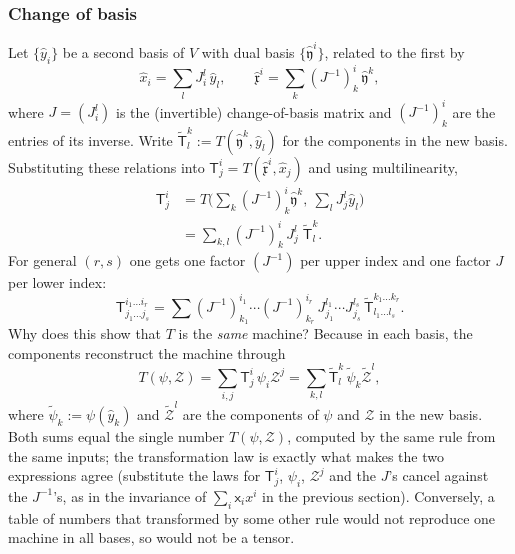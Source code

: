 \documentclass[11pt]{article}
\begin{document}
\subsubsection*{Change of basis}
Let $\{\hat y_i\}$ be a second basis of $V$ with dual basis $\{\hat{\mathfrak y}^i\}$, related to the first by
\[
\hat x_i=\sum_l J^l_i\,\hat y_l,\qquad \hat{\mathfrak x}^i=\sum_k(J^{-1})^i_k\,\hat{\mathfrak y}^k,
\]
where $J=(J^l_i)$ is the (invertible) change-of-basis matrix and $(J^{-1})^i_k$ are the entries of its inverse. Write $\tilde{\mathsf T}^k_l:=T(\hat{\mathfrak y}^k,\hat y_l)$ for the components in the new basis. Substituting these relations into $\mathsf T^i_j=T(\hat{\mathfrak x}^i,\hat x_j)$ and using multilinearity,
\begin{align*}
\mathsf T^i_j&=T\Big(\sum_k(J^{-1})^i_k\hat{\mathfrak y}^k,\ \sum_lJ^l_j\hat y_l\Big)\\
&=\sum_{k,l}(J^{-1})^i_k\,J^l_j\;\tilde{\mathsf T}^k_l.
\end{align*}
For general $(r,s)$ one gets one factor $(J^{-1})$ per upper index and one factor $J$ per lower index:
\[
\mathsf T^{i_1\dots i_r}_{j_1\dots j_s} = \sum (J^{-1})^{i_1}_{k_1}\cdots (J^{-1})^{i_r}_{k_r}\, J^{l_1}_{j_1}\cdots J^{l_s}_{j_s}\, \tilde{\mathsf T}^{k_1\dots k_r}_{l_1\dots l_s}.
\]
Why does this show that $T$ is the \emph{same} machine? Because in each basis, the components reconstruct the machine through
\[
T(\psi,\mathcal Z)=\sum_{i,j}\mathsf T^i_j\,\psi_i\mathcal Z^j=\sum_{k,l}\tilde{\mathsf T}^k_l\,\tilde\psi_k\tilde{\mathcal Z}^l,
\]
where $\tilde\psi_k:=\psi(\hat y_k)$ and $\tilde{\mathcal Z}^l$ are the components of $\psi$ and $\mathcal Z$ in the new basis. Both sums equal the single number $T(\psi,\mathcal Z)$, computed by the same rule from the same inputs; the transformation law is exactly what makes the two expressions agree (substitute the laws for $\mathsf T^i_j$, $\psi_i$, $\mathcal Z^j$ and the $J$'s cancel against the $J^{-1}$'s, as in the invariance of $\sum_i\mathsf x_ix^i$ in the previous section). Conversely, a table of numbers that transformed by some other rule would not reproduce one machine in all bases, so would not be a tensor.
\end{document}
